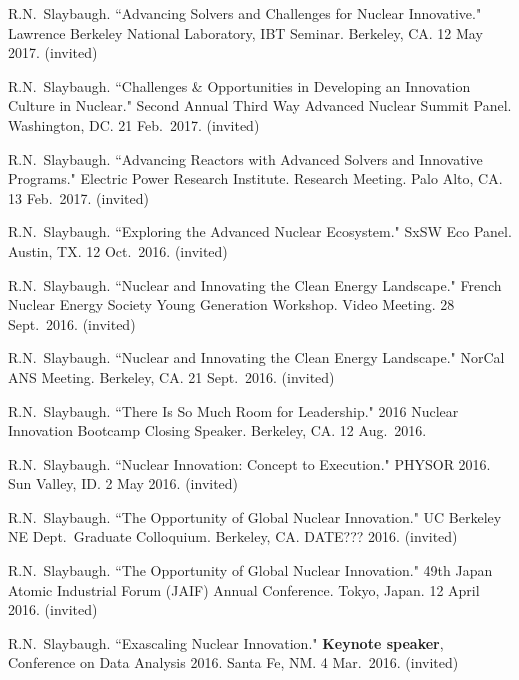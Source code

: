 \begin{bibsection}
\item R.N.\ Slaybaugh. ``Advancing Solvers and Challenges for Nuclear Innovative." Lawrence Berkeley National Laboratory, IBT Seminar. Berkeley, CA. 12 May 2017. (invited)

\item R.N.\ Slaybaugh. ``Challenges \& Opportunities in Developing an Innovation Culture in Nuclear." Second Annual Third Way Advanced Nuclear Summit Panel. Washington, DC. 21 Feb.\ 2017. (invited)

\item R.N.\ Slaybaugh. ``Advancing Reactors with Advanced Solvers and Innovative Programs." Electric Power Research Institute. Research Meeting. Palo Alto, CA. 13 Feb.\ 2017. (invited)

\item R.N.\ Slaybaugh. ``Exploring the Advanced Nuclear Ecosystem." SxSW Eco Panel. Austin, TX. 12 Oct.\ 2016. (invited)

\item R.N.\ Slaybaugh. ``Nuclear and Innovating the Clean Energy Landscape." French Nuclear Energy Society Young Generation Workshop. Video Meeting. 28 Sept.\ 2016. (invited)

\item R.N.\ Slaybaugh. ``Nuclear and Innovating the Clean Energy Landscape." NorCal ANS Meeting. Berkeley, CA. 21 Sept.\ 2016. (invited)

\item R.N.\ Slaybaugh. ``There Is So Much Room for Leadership." 2016 Nuclear Innovation Bootcamp Closing Speaker. Berkeley, CA. 12 Aug.\ 2016.\\

\item R.N.\ Slaybaugh. ``Nuclear Innovation: Concept to Execution." PHYSOR 2016. Sun Valley, ID. 2 May 2016. (invited)

\item R.N.\ Slaybaugh. ``The Opportunity of Global Nuclear Innovation." UC Berkeley NE Dept.\ Graduate Colloquium. Berkeley, CA. DATE??? 2016. (invited)

\item R.N.\ Slaybaugh. ``The Opportunity of Global Nuclear Innovation." 49th Japan Atomic Industrial Forum (JAIF) Annual Conference. Tokyo, Japan. 12 April 2016. (invited)

\item R.N.\ Slaybaugh. ``Exascaling Nuclear Innovation." \textbf{Keynote speaker}, Conference on Data Analysis 2016. Santa Fe, NM. 4 Mar.\ 2016. (invited) 


\end{bibsection}
